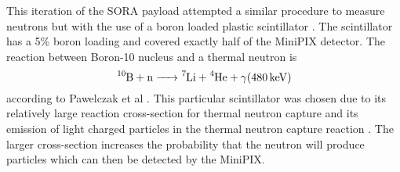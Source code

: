This iteration of the SORA payload attempted a similar procedure to measure neutrons but with the use of a boron loaded plastic scintillator \cite{BoronScintillator}.
The scintillator has a 5\% boron loading and covered exactly half of the MiniPIX detector.
The reaction between Boron-10 nucleus and a thermal neutron is \[\ce{^10B + n -> ^7Li + ^4He + \gamma (\SI{480}{\kilo\eV})}\] according to Pawelczak et al \cite{Pawelczak}.
This particular scintillator was chosen due to its relatively large reaction cross-section for thermal neutron capture and its emission of light charged particles in the thermal neutron capture reaction \cite{Pawelczak}.
The larger cross-section increases the probability that the neutron will produce particles which can then be detected by the MiniPIX.
